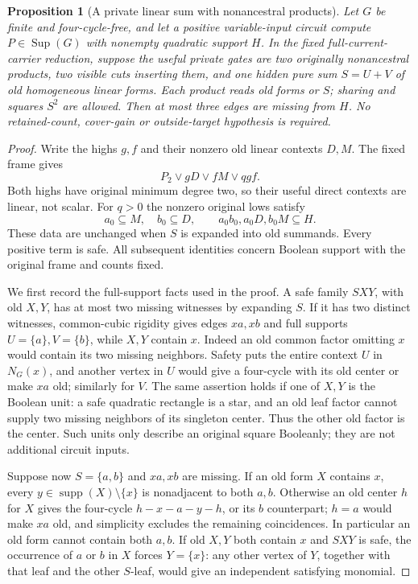 \documentclass[11pt]{article}
\newcommand{\supp}{\operatorname{supp}}
\newcommand{\Sup}{\operatorname{Sup}}
\newtheorem{proposition}[theorem]{Proposition}
\theoremstyle{definition}
\theoremstyle{remark}
\begin{document}
\begin{proposition}[A private linear sum with nonancestral products]\label{prop:independentlinearglobal}
Let $G$ be finite and four-cycle-free, and let a positive variable-input circuit compute $P\in\Sup(G)$ with nonempty quadratic support $H$. In the fixed full-current-carrier reduction, suppose the useful private gates are two originally nonancestral products, two visible cuts inserting them, and one hidden pure sum $S=U+V$ of old homogeneous linear forms. Each product reads old forms or $S$; sharing and squares $S^2$ are allowed. Then at most three edges are missing from $H$. No retained-count, cover-gain or outside-target hypothesis is required.
\end{proposition}
\begin{proof}
Write the highs $g,f$ and their nonzero old linear contexts $D,M$. The fixed frame gives
\[
 P_2\vee gD\vee fM\vee qgf.
\]
Both highs have original minimum degree two, so their useful direct contexts are linear, not scalar. For $q>0$ the nonzero original lows satisfy
\[
 a_0\subseteq M,\quad b_0\subseteq D,
 \qquad a_0b_0,a_0D,b_0M\subseteq H.
\]
These data are unchanged when $S$ is expanded into old summands. Every positive term is safe. All subsequent identities concern Boolean support with the original frame and counts fixed.

We first record the full-support facts used in the proof. A safe family $SXY$, with old $X,Y$, has at most two missing witnesses by expanding $S$. If it has two distinct witnesses, common-cubic rigidity gives edges $xa,xb$ and full supports $U=\{a\},V=\{b\}$, while $X,Y$ contain $x$. Indeed an old common factor omitting $x$ would contain its two missing neighbors. Safety puts the entire context $U$ in $N_G(x)$, and another vertex in $U$ would give a four-cycle with its old center or make $xa$ old; similarly for $V$. The same assertion holds if one of $X,Y$ is the Boolean unit: a safe quadratic rectangle is a star, and an old leaf factor cannot supply two missing neighbors of its singleton center. Thus the other old factor is the center. Such units only describe an original square Booleanly; they are not additional circuit inputs.

Suppose now $S=\{a,b\}$ and $xa,xb$ are missing. If an old form $X$ contains $x$, every $y\in\supp(X)\setminus\{x\}$ is nonadjacent to both $a,b$. Otherwise an old center $h$ for $X$ gives the four-cycle $h-x-a-y-h$, or its $b$ counterpart; $h=a$ would make $xa$ old, and simplicity excludes the remaining coincidences. In particular an old form cannot contain both $a,b$. If old $X,Y$ both contain $x$ and $SXY$ is safe, the occurrence of $a$ or $b$ in $X$ forces $Y=\{x\}$: any other vertex of $Y$, together with that leaf and the other $S$-leaf, would give an independent satisfying monomial.


\end{proof}
\end{document}
